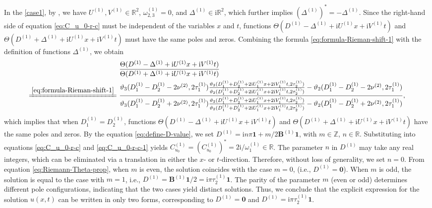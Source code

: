 \documentclass[11pt,reqno]{amsart}
\newcommand{\ii}{\mathrm{i}}
\numberwithin{equation}{section}
\begin{document}
\begin{proof-solution-dn}
	In the \ref{case1}, by , we have $U^{(1)},V^{(1)}\in \mathbb{R}^2$, $\omega_{2,3}^{(1)}=0$, and $\Delta^{(1)}\in \ii \mathbb{R}^2$, which further implies $(\Delta^{(1)})^*=-\Delta^{(1)}$.
	Since the right-hand side of equation \eqref{eq:C_u_0-r-c} must be independent of the variables $x$ and $t$, functions $\Theta(D^{(1)}-\Delta^{(1)}+\ii U^{(1)} x+\ii V^{(1)}t)$ and $\Theta(D^{(1)}+\Delta^{(1)}+\ii U^{(1)} x+\ii V^{(1)}t)$ must have the same poles and zeros.
	Combining the formula \eqref{eq:formula-Rieman-shift-1} with the definition of functions $\Delta^{(1)}$,
	we obtain 
	\begin{equation}\nonumber
		\begin{split}
			&\ \frac{\Theta(D^{(1)}-\Delta^{(1)}+\ii U^{(1)} x+\ii V^{(1)}t)}{\Theta(D^{(1)}+\Delta^{(1)}+\ii U^{(1)} x+\ii V^{(1)}t)}\\
			\xlongequal{\eqref{eq:formula-Rieman-shift-1}} &\ \frac{\vartheta_3(D^{(1)}_1-D^{(1)}_2-2\nu^{(2)},2\tau_1^{(1)})\frac{\vartheta_3(D^{(1)}_1+D^{(1)}_2+2\ii U^{(1)}_1x+2\ii V^{(1)}_1t ,2\tau_2^{(1)})}{\vartheta_2(D^{(1)}_1+D^{(1)}_2+2\ii U^{(1)}_1x+2\ii V^{(1)}_1t ,2\tau_2^{(1)})}-\vartheta_2(D^{(1)}_1-D^{(1)}_2-2\nu^{(2)},2\tau_1^{(1)})}{\vartheta_3(D^{(1)}_1-D^{(1)}_2+2\nu^{(2)},2\tau_1^{(1)})\frac{\vartheta_3(D^{(1)}_1+D^{(1)}_2+2\ii U^{(1)}_1x+2\ii V^{(1)}_1t ,2\tau_2^{(1)})}{\vartheta_2(D^{(1)}_1+D^{(1)}_2+2\ii U^{(1)}_1x+2\ii V^{(1)}_1t ,2\tau_2^{(1)})}-\vartheta_2(D^{(1)}_1-D^{(1)}_2+2\nu^{(2)},2\tau_1^{(1)})},
		\end{split}
	\end{equation}
	which implies that when $D_1^{(1)}=D_2^{(1)}$, functions $\Theta(D^{(1)}-\Delta^{(1)}+\ii U^{(1)} x+\ii V^{(1)}t)$ and $\Theta(D^{(1)}+\Delta^{(1)}+\ii U^{(1)} x+\ii V^{(1)}t)$ have the same poles and zeros. 
	By the equation \eqref{eq:define-D-value},
	we set $D^{(1)}= \ii n \pi \mathbf{1}+m/2 \mathbf{B}^{(1)} \mathbf{1}$,  with $m\in \mathbb{Z}$, $n\in \mathbb{R}$. Substituting into equations \eqref{eq:C_u_0-r-c} and \eqref{eq:C_u_0-r-c-1} yields $C_{u_0}^{(1)}=(C_{u_0}^{(1)})^*=2\ii /\omega_1^{(1)} \in \mathbb{R}$.
	The parameter $n$ in $D^{(1)}$ may take any real integers, which can be eliminated via a translation in either the $x$- or $t$-direction.
	Therefore, without loss of generality,	we set $n = 0$.
	From equation \eqref{eq:Riemann-Theta-prop}, when $m$ is even, the solution coincides with the case $m=0$, (i.e., $D^{(1)}=\mathbf{0}$).
	When $m$ is odd, the solution is equal to the case with $m=1$, i.e., $D^{(1)}= \mathbf{B}^{(1)} \mathbf{1}/2=\ii \pi   \tau^{(1)}_2 \mathbf{1}$.
	The parity of the parameter $m$ (even or odd) determines different pole configurations, indicating that the two cases yield distinct solutions.
	Thus, we conclude that the explicit expression for the solution $u(x,t)$ can be written in only two forms, corresponding to $D^{(1)}=\mathbf{0}$ and $D^{(1)}=\ii \pi   \tau^{(1)}_2 \mathbf{1}$.
		

\end{proof-solution-dn}
\end{document}
